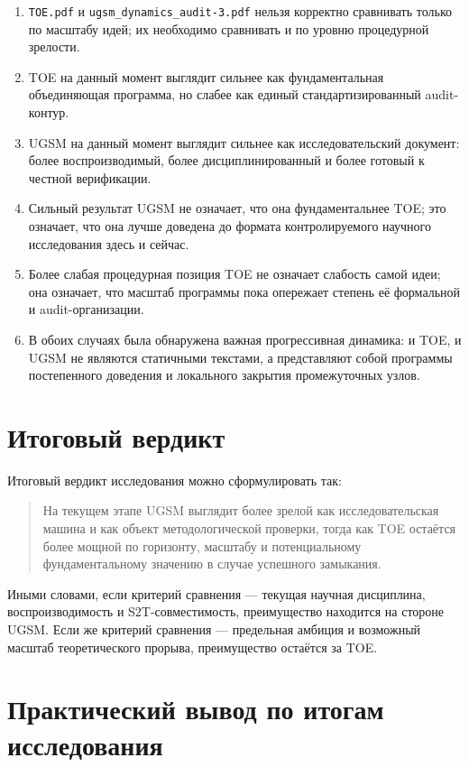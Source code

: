 \documentclass[12pt,a4paper]{article}
\begin{document}
\begin{enumerate}
    \item \texttt{TOE.pdf} и \texttt{ugsm\_dynamics\_audit-3.pdf} нельзя корректно сравнивать только по масштабу идей; их необходимо сравнивать и по уровню процедурной зрелости.
    \item TOE на данный момент выглядит сильнее как фундаментальная объединяющая программа, но слабее как единый стандартизированный audit-контур.
    \item UGSM на данный момент выглядит сильнее как исследовательский документ: более воспроизводимый, более дисциплинированный и более готовый к честной верификации.
    \item Сильный результат UGSM не означает, что она фундаментальнее TOE; это означает, что она лучше доведена до формата контролируемого научного исследования здесь и сейчас.
    \item Более слабая процедурная позиция TOE не означает слабость самой идеи; она означает, что масштаб программы пока опережает степень её формальной и audit-организации.
    \item В обоих случаях была обнаружена важная прогрессивная динамика: и TOE, и UGSM не являются статичными текстами, а представляют собой программы постепенного доведения и локального закрытия промежуточных узлов.
\end{enumerate}

\section{Итоговый вердикт}

Итоговый вердикт исследования можно сформулировать так:

\begin{quote}
На текущем этапе UGSM выглядит более зрелой как исследовательская машина и как объект методологической проверки, тогда как TOE остаётся более мощной по горизонту, масштабу и потенциальному фундаментальному значению в случае успешного замыкания.
\end{quote}

Иными словами, если критерий сравнения --- текущая научная дисциплина, воспроизводимость и S2T-совместимость, преимущество находится на стороне UGSM. Если же критерий сравнения --- предельная амбиция и возможный масштаб теоретического прорыва, преимущество остаётся за TOE.

\section{Практический вывод по итогам исследования}
\end{document}

